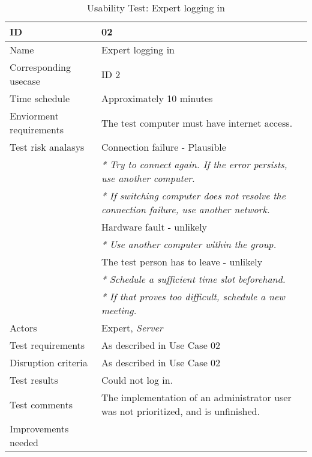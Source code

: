 {\footnotesize
\begin{table}[H]
\begin{tabular}{| p{5cm} | p{10cm} |}\hline
	\textbf{ID}	& \textbf{02} \\ \hline
	Name		& Expert logging in\\ \hline
	Corresponding usecase & ID 2\\ \hline
	Time schedule	& Approximately 10 minutes\\ \hline
	Enviorment requirements 
		& The test computer must have internet access. \\ \hline
	Test risk analasys 
		& Connection failure - Plausible \\
		& \emph{* Try to connect again. If the error persists, use another computer.} \\
		& \emph{* If switching computer does not resolve the connection failure, use another network.}\\
		& Hardware fault - unlikely \\
		& \emph{* Use another computer within the group.} \\
		& The test person has to leave - unlikely \\
		& \emph{* Schedule a sufficient time slot beforehand.} \\
		& \emph{* If that proves too difficult, schedule a new meeting.}\\ \hline
	Actors	& Expert, \emph{Server}\\ \hline
	Test requirements & As described in Use Case 02 \\ \hline
	Disruption criteria & As described in Use Case 02  \\ \hline
	Test results & Could not log in. \\ \hline
	Test comments & The implementation of an administrator user was not prioritized, and is unfinished.\\ \hline
	Improvements needed & \\ \hline
\end{tabular}


\caption{Usability Test: Expert logging in}
\label{fig:usability_test_2}
\end{table}}



